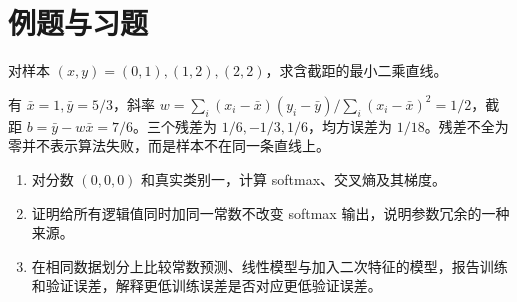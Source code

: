 \section{例题与习题}
\begin{example}[拟合一条直线]
对样本 $(x,y)=(0,1),(1,2),(2,2)$，求含截距的最小二乘直线。
\end{example}
\begin{solve}
有 $\bar x=1,\bar y=5/3$，斜率 $w=\sum_i(x_i-\bar x)(y_i-\bar y)/\sum_i(x_i-\bar x)^2=1/2$，截距 $b=\bar y-w\bar x=7/6$。三个残差为 $1/6,-1/3,1/6$，均方误差为 $1/18$。残差不全为零并不表示算法失败，而是样本不在同一条直线上。
\end{solve}
\begin{enumerate}
\item 对分数 $(0,0,0)$ 和真实类别一，计算 softmax、交叉熵及其梯度。
\item 证明给所有逻辑值同时加同一常数不改变 softmax 输出，说明参数冗余的一种来源。
\item 在相同数据划分上比较常数预测、线性模型与加入二次特征的模型，报告训练和验证误差，解释更低训练误差是否对应更低验证误差。
\end{enumerate}

